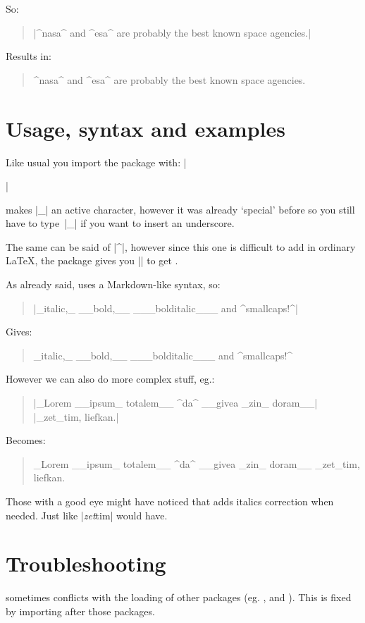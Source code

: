 \documentclass[11pt, cm-default]{l3doc}
\begin{document}
	So:
	\begin{quote}
		|^nasa^ and ^esa^ are probably the best known space agencies.|
	\end{quote}

	Results in:
	\begin{quote}
		^nasa^ and ^esa^ are probably the best known space agencies.
	\end{quote}


	\section{Usage, syntax and examples}
	Like usual you import the package with: |\usepackage{easyformat}|

	 makes |_| an active character, however it was already
	`special' before so you still have to type~|\_| if you want to insert
	an underscore.
	
	The same can be said of |^|, however since this one is difficult to add
	in ordinary \LaTeX, the  package gives you |\cir|
	to get \cir.
	
	\newpage

	As already said,  uses a Markdown-like syntax, so:
	
	\begin{quote}
		|_italic,_ __bold,__ ___bolditalic___ and ^smallcaps!^|
	\end{quote}

	Gives:
	\begin{quote}
		_italic,_ __bold,__ ___bolditalic___ and ^smallcaps!^
	\end{quote}

	However we can also do more complex stuff, eg.:
	\begin{quote}
		|_Lorem __ipsum_ totalem__ ^da^ __givea _zin_ doram__|\\
		|_zet_tim, liefkan.|
	\end{quote}
	
	Becomes:
	\begin{quote}
		_Lorem __ipsum_ totalem__ ^da^ __givea _zin_ doram__ _zet_tim, liefkan.
	\end{quote}

	Those with a good eye might have noticed that  adds
	italics correction when needed. Just like |\textit{zet}tim| would have.


	\section{Troubleshooting}
	 sometimes conflicts with the loading of other packages (eg.
	,  and ). This is fixed by importing
	 after those packages.
	
\end{document}
